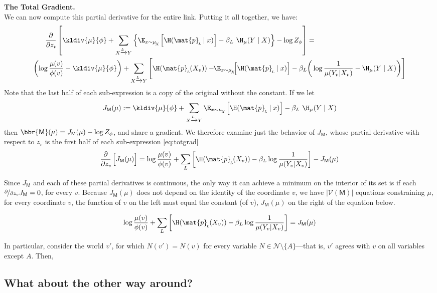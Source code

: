 \documentclass{article}
\newcommand{\bp}[1][L]{\mat{p}_{\!_#1\!}}
\newcommand{\V}{\mathcal V}
\newcommand{\N}{\mathcal N}
\newcommand{\sfM}{\mathsf M}
\newcommand{\alle}[1][L]{_{ X \xrightarrow{\!\!#1} Y }}
\begin{document}
	\textbf{The Total Gradient.}\\
	We can now compute this partial derivative for the entire link. Putting it all together, we have:
	\begin{equation}
	\begin{aligned}
		\pz{\kldiv{\mu}{\phi} + \sum\alle\left\{ \E_{x \sim \mu_{\!_X}} \Big[ \H(\bp \mid x)\Big] - \beta_L \ \H_\mu(Y \mid X)\right\}  - \log Z_\phi }
			&= \\
			\left(\log\frac{\mu(v)}{\phi(v)} - \kldiv{\mu}{\phi} \right) + \sum\alle\Bigg[ \H(\bp(X_v)) - \!\! \E_{x \sim \mu_{\!_X}}\!\! \Big[ \H(\bp \mid x)\Big]  - \beta_L & \bigg(\log \frac{1}{\mu(Y_v | X_v)} - \H_\mu(Y \mid X) \bigg) \Bigg] 
	\end{aligned}\label{eq:totgrad}
	\end{equation}
	Note that the last half of each sub-expression is a copy of the original without the constant. If we let
	\[ J_\sfM(\mu) := \kldiv{\mu}{\phi} + \sum\alle \E_{x \sim \mu_{\!_X}} \Big[ \H(\bp \mid x)\Big] - \beta_L \ \H_\mu(Y \mid X) \]
	then $\bbr{\sfM}(\mu) = J_\sfM(\mu) - \log Z_\phi$, and share a gradient. We therefore examine just the behavior of $J_\sfM$, whose partial derivative with respect to $z_v$ is the first half of each sub-expression \eqref{eq:totgrad}
	\[ \pz{J_\sfM(\mu)} = \log\frac{\mu(v)}{\phi(v)} + \sum_L\left[ \H(\bp(X_v)) - \beta_L \log \frac{1}{\mu(Y_v | X_v)} \right] - J_\sfM(\mu) \] 
	
	
	Since $J_\sfM$ and each of these partial derivatives is continuous, the only way it can achieve a minimum on the interior of its set is if each $\nicefrac{\partial}{\partial z_v} J_\sfM = 0$, for every $v$. Because $J_\sfM(\mu)$ does not depend on the identity of the coordinate $v$, we have $|\V(\sfM)|$ equations constraining $\mu$, for every coordinate $v$, the function of $v$ on the left must equal the constant (of $v$), $J_\sfM(\mu)$ on the right of the equation below.
		
	\[  \log\frac{\mu(v)}{\phi(v)} + \sum_L\left[ \H(\bp(X_v)) - \beta_L \log \frac{1}{\mu(Y_v | X_v)} \right] = J_\sfM(\mu) \]
	
	In particular, consider the world $v'$, for which $N(v') = N(v)$ for every variable $N \in \N \setminus \{A\}$---that is, $v'$ agrees with $v$ on all variables except $A$. Then,
	
	\endgroup
	\subsection{What about the other way around?}
	
\end{document}
